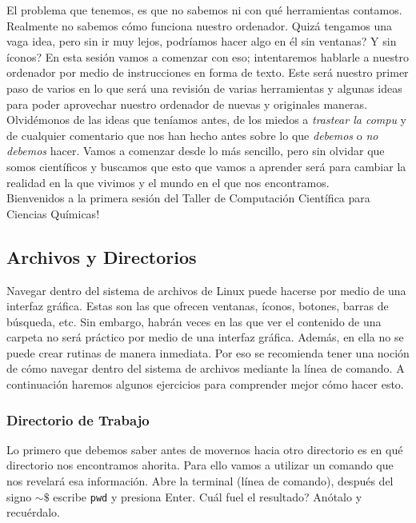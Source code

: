 \documentclass[10pt,letterpaper]{article}
\newcommand{\inlinecode}[1]{
\colorbox{light-gray}{\texttt{#1}}
}
\begin{document}
El problema que tenemos, es que no sabemos ni con qu\'e herramientas contamos. Realmente no sabemos c\'omo funciona nuestro ordenador. Quiz\'a tengamos una vaga idea, pero sin ir muy lejos, podr\'iamos hacer algo en \'el sin ventanas? Y sin \'iconos? En esta sesi\'on vamos a comenzar con eso; intentaremos hablarle a nuestro ordenador por medio de instrucciones en forma de texto. Este ser\'a nuestro primer paso de varios en lo que ser\'a una revisi\'on de varias herramientas y algunas ideas para poder aprovechar nuestro ordenador de nuevas y originales maneras. Olvid\'emonos de las ideas que ten\'iamos antes, de los miedos a \emph{trastear la compu} y de cualquier comentario que nos han hecho antes sobre lo que \emph{debemos} o \emph{no debemos} hacer. Vamos a comenzar desde lo m\'as sencillo, pero sin olvidar que somos cient\'ificos y buscamos que esto que vamos a aprender ser\'a para cambiar la realidad en la que vivimos y el mundo en el que nos encontramos.\\

\noindent Bienvenidos a la primera sesi\'on del Taller de Computaci\'on Cient\'ifica para Ciencias Qu\'imicas!

\pagebreak

\subsection{Archivos y Directorios}
Navegar dentro del sistema de archivos de Linux puede hacerse por medio de una interfaz gr\'afica. Estas son las que ofrecen ventanas, \'iconos, botones, barras de b\'usqueda, etc. Sin embargo, habr\'an veces en las que ver el contenido de una carpeta no ser\'a pr\'actico por medio de una interfaz gr\'afica. Adem\'as, en ella no se puede crear rutinas de manera inmediata. Por eso se recomienda tener una noci\'on de c\'omo navegar dentro del sistema de archivos mediante la l\'inea de comando. A continuaci\'on haremos algunos ejercicios para comprender mejor c\'omo hacer esto.

\subsubsection{Directorio de Trabajo}
Lo primero que debemos saber antes de movernos hacia otro directorio es en qu\'e directorio nos encontramos ahorita. Para ello vamos a utilizar un comando que nos revelar\'a esa informaci\'on. Abre la terminal (l\'inea de comando), despu\'es del signo \inlinecode{$\sim\$ $} escribe \inlinecode{pwd} y presiona Enter. Cu\'al fuel el resultado? An\'otalo y recu\'erdalo.
\end{document}
